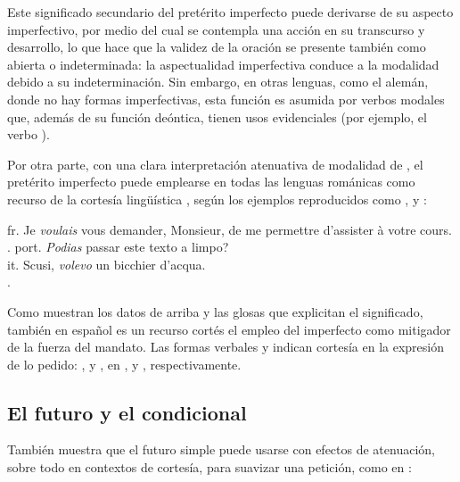 Este significado secundario del pretérito imperfecto puede derivarse de su
aspecto imperfectivo, por medio del cual se contempla una acción en su
transcurso y desarrollo, lo que hace que la validez de la oración se presente
también como abierta o indeterminada: la aspectualidad imperfectiva conduce a la
modalidad debido a su indeterminación. Sin embargo, en otras lenguas, como el
alemán, donde no hay formas imperfectivas, esta función es asumida por verbos
modales que, además de su función deóntica, tienen usos evidenciales (por
ejemplo, el verbo ).

Por otra parte, con una clara interpretación atenuativa de modalidad de
, el pretérito imperfecto puede emplearse en todas las lenguas
románicas como recurso de la cortesía lingüística \parencite[21]{hassler2017},
según los ejemplos reproducidos como ,  y
:

\begin{exe}
  \ex\label{ex:14-fr} fr. Je \textit{voulais} vous demander, Monsieur, de me
      permettre d'assister à votre cours.\\
      .
  \ex\label{ex:14-port} port. \textit{Podias} passar este texto a limpo?\\
  \ex\label{ex:14-it} it. Scusi, \textit{volevo} un bicchier d'acqua.\\
      .
\end{exe}

Como muestran los datos de arriba y las glosas que explicitan el significado,
también en español es un recurso cortés el empleo del imperfecto como mitigador
de la fuerza del mandato. Las formas verbales  y 
indican cortesía en la expresión de lo pedido: ,
 y , en
,  y , respectivamente.

\subsection{El futuro y el condicional}\label{sec:14-futuro}

También \textcite[22]{hassler2017} muestra que el futuro simple puede usarse con
efectos de atenuación, sobre todo en contextos de cortesía, para suavizar una
petición, como en :


